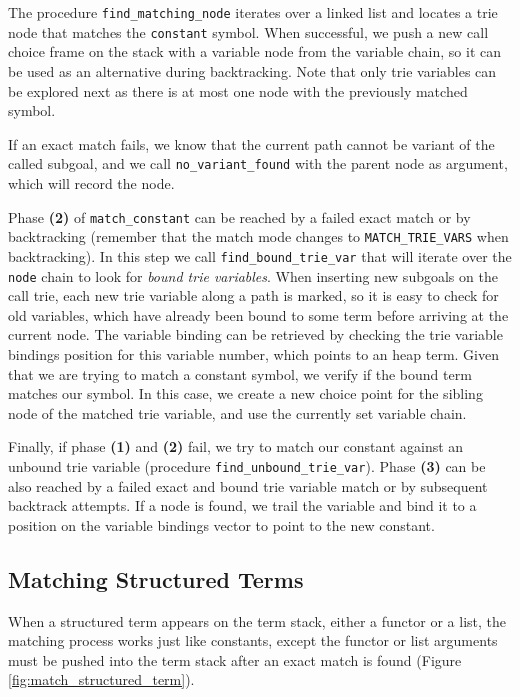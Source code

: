 The procedure \texttt{find\_matching\_node} iterates over a linked list and locates a trie node that matches the
\texttt{constant} symbol. When successful, we push a new call choice frame on the stack
with a variable node from the variable chain, so it can be used as an alternative during backtracking.
Note that only trie variables can be explored next as there is at most one node with the previously matched symbol.

If an exact match fails, we know that the current path cannot be variant of the called subgoal, and we call
\texttt{no\_variant\_found} with the parent node as argument, which will record the node.

Phase \textbf{(2)} of \texttt{match\_constant} can be reached by a failed exact match or by backtracking
(remember that the match mode changes to \texttt{MATCH\_TRIE\_VARS} when backtracking). In this step
we call \texttt{find\_bound\_trie\_var} that will iterate over the \texttt{node} chain to look for
\textit{bound trie variables}. When inserting new subgoals on the call trie, each new trie variable
along a path is marked, so it is easy to check for old variables, which have already been bound
to some term before arriving at the current node. The variable binding can be retrieved by
checking the trie variable bindings position for this variable number, which points to an heap term.
Given that we are trying to match a constant symbol, we verify if the bound term matches our symbol.
In this case, we create a new choice point for the sibling node of the matched trie variable, and use
the currently set variable chain.

Finally, if phase \textbf{(1)} and \textbf{(2)} fail, we try to match our constant against an unbound trie variable
(procedure \texttt{find\_unbound\_trie\_var}).
Phase \textbf{(3)} can be also reached by a failed exact and bound trie variable match or by subsequent backtrack
attempts. If a node is found, we trail the variable and bind it to a position on the variable bindings
vector to point to the new constant.

\subsection{Matching Structured Terms}

When a structured term appears on the term stack, either a functor or a list, the matching process works
just like constants, except the functor or list arguments must be pushed into the term stack after an exact
match is found (Figure \ref{fig:match_structured_term}).

